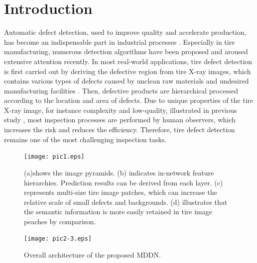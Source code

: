 \documentclass{article}
\begin{document}
\section{Introduction}
\label{sec:intro}
Automatic defect detection, used to improve quality and accelerate production, has become an indispensable part in industrial processes \cite{kumar2008computer,li2016deformable,ghorai2012automatic}. Especially in tire manufacturing, numerous detection algorithms have been proposed \cite{zhang2013texture,zhang2018tire,xiang2014dictionary} and aroused extensive attention recently. In most real-world applications, tire defect detection is first carried out by deriving the defective region from tire X-ray images, which contains various types of defects caused by unclean raw materials and undesired manufacturing facilities \cite{guo2016defect}. Then, defective products are hierarchical processed according to the location and area of defects. Due to unique properties of the tire X-ray image, for instance complexity and low-quality, illustrated in previous study \cite{zhang2013defect,wang2019tire}, most inspection processes are performed by human observers, which increases the risk and reduces the efficiency. Therefore, tire defect detection remains one of the most challenging inspection tasks.
\begin{figure}[t]
  \centering
  \centerline{\texttt{[image: pic1.eps]}}
  \caption{(a)shows the image pyramids. (b) indicates in-network feature hierarchies. Prediction results can be derived from each layer. (c) represents multi-size tire image patches, which can increase the relative scale of small defects and backgrounds. (d) illustrates that the semantic information is more easily retained in tire image peaches by comparison.}
\end{figure}
\begin{figure}[t]
  \centering
  \centerline{\texttt{[image: pic2-3.eps]}}
  \caption{Overall architecture of the proposed MDDN. }
\end{figure}
\end{document}
